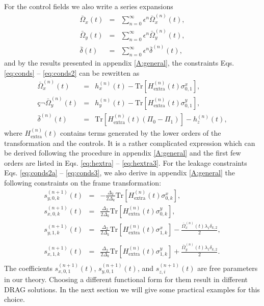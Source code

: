 \documentclass[pra,twocolumn,floatfix,superscriptaddress,eqsecnum]{revtex4-1}
\begin{document}
For the control fields we also write a series expansions
\begin{eqnarray}
\bar\Omega_{x}(t)&=& \sum_{n=0}^{\infty} \epsilon^n \bar\Omega^{(n)}_{x}(t), \\
\bar\Omega_{y}(t)&=& \sum_{n=0}^{\infty} \epsilon^n \bar\Omega^{(n)}_{y}(t), \\
 \bar\delta(t)&=& \sum_{n=0}^{\infty} \epsilon^n \bar\delta^{(n)}(t),
\end{eqnarray} 
 and by the results presented in appendix \ref{A:general}, the constraints Eqs. \eqref{eq:conds} -- \eqref{eq:conds2} can be rewritten as
\begin{eqnarray} \label{eq:controlcon}
   \bar\Omega_{x}^{(n)}(t) & =& h_x^{(n)}(t)-\mathrm{Tr} [ {H}_\mathrm{extra}^{(n)}(t) \sigma^x_{0,1} ], \\ç¬
 \bar\Omega_{y}^{(n)}(t) &=& h_y^{(n)}(t)- \mathrm{Tr} [ {H}_\mathrm{extra}^{(n)}(t) \sigma^y_{0,1} ], \\
 \bar\delta^{(n)}(t) & =& \mathrm{Tr} [ {H}_\mathrm{extra}^{(n)}(t)\left(\Pi_0 - \Pi_1 \right)]-h_z^{(n)}(t), \label{eq:controlcon2}
\end{eqnarray} where ${H}_\mathrm{extra}^{(n)}(t)$ contains terms generated by the lower orders of the transformation and the controls.
It is a rather complicated expression which can be derived following the procedure in appendix \ref{A:general} and the first few orders are listed in Eqs. \eqref{eq:hextra} -- \eqref{eq:hextra3}.  For the leakage constraints Eqs. \eqref{eq:conds2a} -- \eqref{eq:conds3}, we also derive in appendix \ref{A:general} the following constraints on the frame transformation: 
\begin{eqnarray}
\label{eq:framecon}
 s^{(n+1)}_{y,0,k}(t)&=&-\frac{\Delta_2}{2 \Delta_k}\mathrm{Tr}[{H}_\mathrm{extra}^{(n)}(t) \sigma^x_{0,k}],\\
s^{(n+1)}_{x,0,k}(t)&=&\frac{\Delta_2}{2 \Delta_k}\mathrm{Tr}[{H}_\mathrm{extra}^{(n)} (t)\sigma^y_{0,k}]\label{eq:framecon2b},\\
 s^{(n+1)}_{y,1,k}(t)&=&\frac{\Delta_2}{2 \Delta_k}\mathrm{Tr}[{H}_\mathrm{extra}^{(n)} (t)\sigma^x_{1,k}] -  \frac{\bar\Omega_x^{(n)}(t)\lambda_1\delta_{k,2}}{2}, \label{eq:framecon2a}\nonumber\\\\
s^{(n+1)}_{x,1,k}(t)&=&\frac{\Delta_2}{2 \Delta_k}\mathrm{Tr}[{H}_\mathrm{extra}^{(n)}(t)\sigma^y_{1,k}] + \frac{\bar\Omega_y^{(n)}(t)\lambda_1\delta_{k,2}}{2}.\nonumber\\
 \label{eq:framecon2}
\end{eqnarray}
The coefficients $s^{(n+1)}_{x,0,1}(t)$, $s^{(n+1)}_{y,0,1}(t)$, and $s^{(n+1)}_{z,i}(t)$ are free parameters in our theory.  Choosing a different functional form for them result in different DRAG solutions. In the next section we will give some practical examples for this choice.
\end{document}
